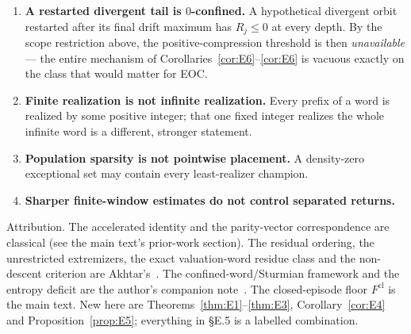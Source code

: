 \documentclass[11pt,a4paper]{article}
\theoremstyle{plain}
\theoremstyle{definition}
\newcommand{\Fcl}{F^{\mathrm{cl}}}
\begin{document}
\begin{enumerate}
\item[(1)] \textbf{A restarted divergent tail is $0$-confined.} A hypothetical
divergent orbit restarted after its final drift maximum has $R_j\le0$ at every
depth. By the scope restriction above, the positive-compression threshold is
then \emph{unavailable} --- the entire mechanism of
Corollaries~\ref{cor:E6}--\ref{cor:E6} is vacuous exactly on the class that
would matter for EOC.
\item[(2)] \textbf{Finite realization is not infinite realization.} Every
prefix of a word is realized by some positive integer; that one fixed integer
realizes the whole infinite word is a different, stronger statement.
\item[(3)] \textbf{Population sparsity is not pointwise placement.} A
density-zero exceptional set may contain every least-realizer champion.
\item[(4)] \textbf{Sharper finite-window estimates do not control separated
returns.}
\end{enumerate}

\noindent Attribution. The accelerated identity and the parity-vector
correspondence are classical (see the main text's prior-work section). The
residual ordering, the unrestricted extremizers, the exact valuation-word
residue class and the non-descent criterion are Akhtar's~\cite{akhtar2026}. The
confined-word/Sturmian framework and the entropy deficit are the author's
companion note~\cite{E-sturmian}. The closed-episode floor $\Fcl$ is the main
text. New here are Theorems~\ref{thm:E1}--\ref{thm:E3},
Corollary~\ref{cor:E4} and Proposition~\ref{prop:E5}; everything in \S E.5 is
a labelled combination.
\end{document}
